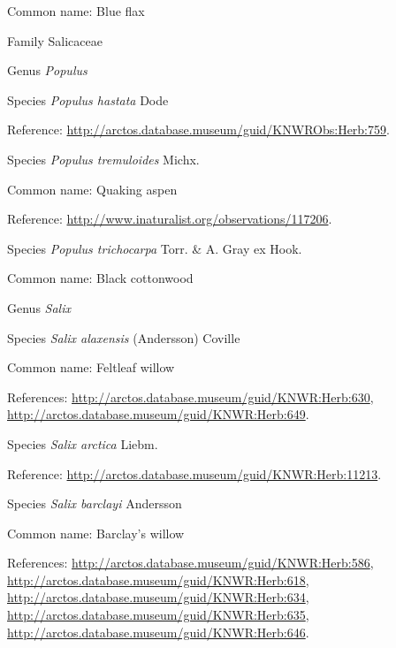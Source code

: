 \documentclass[9pt, article]{memoir}
\begin{document}
\begin{multicols}{2}
Common name: Blue flax

\vspace{6pt}\noindent\hspace{24pt}Family Salicaceae


\vspace{6pt}\noindent\hspace{30pt}Genus \textit{Populus}


\vspace{6pt}\noindent\hspace{36pt}Species \textit{Populus hastata} Dode


Reference: 
\url{http://arctos.database.museum/guid/KNWRObs:Herb:759}.

\vspace{6pt}\noindent\hspace{36pt}Species \textit{Populus tremuloides} Michx.


Common name: Quaking aspen

Reference: 
\url{http://www.inaturalist.org/observations/117206}.

\vspace{6pt}\noindent\hspace{36pt}Species \textit{Populus trichocarpa} Torr. \& A. Gray ex Hook.


Common name: Black cottonwood

\vspace{6pt}\noindent\hspace{30pt}Genus \textit{Salix}


\vspace{6pt}\noindent\hspace{36pt}Species \textit{Salix alaxensis} (Andersson) Coville


Common name: Feltleaf willow

References: 
\url{http://arctos.database.museum/guid/KNWR:Herb:630}, 
\url{http://arctos.database.museum/guid/KNWR:Herb:649}.

\vspace{6pt}\noindent\hspace{36pt}Species \textit{Salix arctica} Liebm.


Reference: 
\url{http://arctos.database.museum/guid/KNWR:Herb:11213}.

\vspace{6pt}\noindent\hspace{36pt}Species \textit{Salix barclayi} Andersson


Common name: Barclay's willow

References: 
\url{http://arctos.database.museum/guid/KNWR:Herb:586}, 
\url{http://arctos.database.museum/guid/KNWR:Herb:618}, 
\url{http://arctos.database.museum/guid/KNWR:Herb:634}, 
\url{http://arctos.database.museum/guid/KNWR:Herb:635}, 
\url{http://arctos.database.museum/guid/KNWR:Herb:646}.


\end{multicols}
\end{document}
